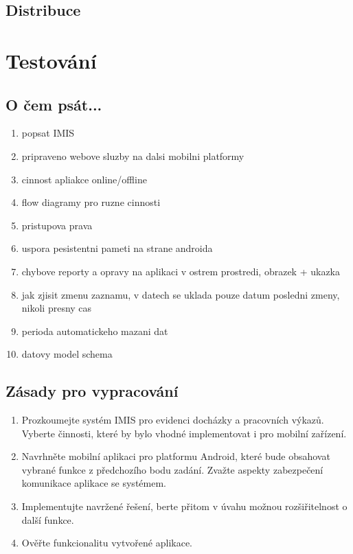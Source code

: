 \documentclass{bakalarka}
\begin{document}
\section{Distribuce}

\chapter{Testování}

\section{O čem psát...}
\begin{enumerate}
\item popsat IMIS 
\item pripraveno webove sluzby na dalsi mobilni platformy
\item cinnost apliakce online/offline
\item flow diagramy pro ruzne cinnosti
\item pristupova prava
\item uspora pesistentni pameti na strane androida
\item chybove reporty a opravy na aplikaci v ostrem prostredi, obrazek + ukazka
\item jak zjisit zmenu zaznamu, v datech se uklada pouze datum posledni zmeny, nikoli presny cas
\item perioda automatickeho mazani dat
\item datovy model schema
\end{enumerate}

\section{Zásady pro vypracování}
\begin{enumerate}
\item Prozkoumejte systém IMIS pro evidenci docházky a pracovních výkazů. Vyberte činnosti, které by bylo vhodné implementovat i pro mobilní zařízení.
\item Navrhněte mobilní aplikaci pro platformu Android, které bude obsahovat vybrané funkce z předchozího bodu zadání.
Zvažte aspekty zabezpečení komunikace aplikace se systémem.
\item Implementujte navržené řešení, berte přitom v úvahu možnou rozšiřitelnost o další funkce.
\item Ověřte funkcionalitu vytvořené aplikace.
\end{enumerate}
\end{document}
